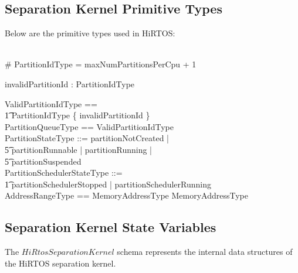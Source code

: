 \documentclass[11pt,letterpaper,twoside,openany]{book}
\begin{document}
\subsection{Separation Kernel Primitive Types}

Below are the primitive types used in HiRTOS:

\begin{zed}
[PartitionIdType] \\
\# PartitionIdType = maxNumPartitionsPerCpu + 1 \\
\end{zed}

\begin{axdef}
   invalidPartitionId : PartitionIdType \\
\end{axdef}

\begin{zed}
    ValidPartitionIdType == \\
    \t1 PartitionIdType \setminus \{ invalidPartitionId \} \\
    PartitionQueueType == \iseq ValidPartitionIdType \\
    PartitionStateType ::= partitionNotCreated | \\
    \t5 partitionRunnable | partitionRunning | \\
    \t5 partitionSuspended \\
    PartitionSchedulerStateType ::= \\
    \t1 partitionSchedulerStopped | partitionSchedulerRunning \\
    AddressRangeType == MemoryAddressType \cross MemoryAddressType \\
\end{zed}

\subsection{Separation Kernel State Variables}

The $HiRtosSeparationKernel$ schema represents the internal data
structures of the HiRTOS separation kernel.
\end{document}
